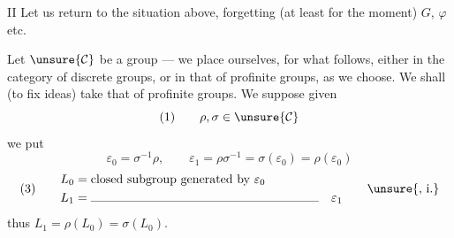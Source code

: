 
II Let us return to the situation above, forgetting (at least for the moment) $G$, $\varphi$ etc.


Let $\unsure{\mathcal{C}}$ be a group --- we place ourselves, for what follows, either in the category of discrete groups, or in that of profinite groups, as we choose. We shall (to fix ideas) take that of profinite groups. We suppose given
\[
(1)\qquad \rho,\sigma\in\unsure{\mathcal{C}}
\]
\margin{[\unsure{i.e. we have between} $\varepsilon_0=\ell'_0$, $\sigma=\ell'_1$ and $\rho^{-1}=\ell'_\infty$ with relation (2) $\ell'_\infty\ell'_1\ell'_0=1$]}
we put
\[
\varepsilon_0=\sigma^{-1}\rho,\qquad
\varepsilon_1=\rho\sigma^{-1}=\sigma(\varepsilon_0)=\rho(\varepsilon_0)
\]
\[
(3)\qquad
\begin{aligned}
L_0&=\text{closed subgroup generated by }\varepsilon_0\\
L_1&=\rule{6.5cm}{0.3pt}\quad\varepsilon_1
\end{aligned}
\qquad\unsure{\text{, i.}}
\]
thus $L_1=\rho(L_0)=\sigma(L_0)$.

